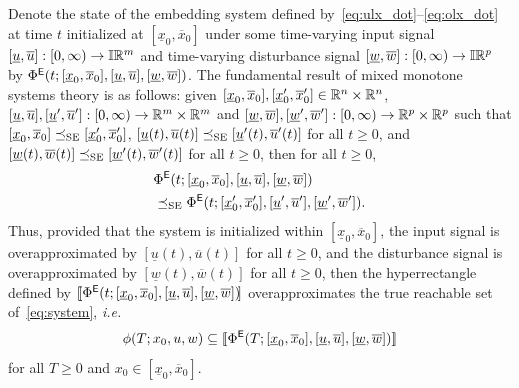 \documentclass{IEEEojcsys}
\newcommand{\ul}{\underline}
\newcommand{\ol}{\overline}
\begin{document}
Denote the state of the embedding system defined by~\eqref{eq:ulx_dot}--\eqref{eq:olx_dot} at time $t$ initialized at $[\ul{x}_0,\ol{x}_0]$ under some time-varying input signal $[\ul{u}, \ol{u}]:[0,\infty)\to\bbI\mathbb{R}^m$ and time-varying disturbance signal $[\ul{w},\ol{w}]:[0,\infty)\to\bbI\mathbb{R}^p$ by $\Phi^\sfE(t;[\ul{x}_0, \ol{x}_0], [\ul{u}, \ol{u}], [\ul{w},\ol{w}])$. 
The fundamental result of mixed monotone systems theory is as follows:
given $[\ulx_0, \olx_0],[\ulx'_0, \olx'_0] \in \mathbb{R}^n\times \mathbb{R}^n$, $[\ulu, \olu], [\ulu', \olu']:[0, \infty) \rightarrow \mathbb{R}^m\times\mathbb{R}^m$ and $[\ulw, \olw],[\ulw', \olw']:[0, \infty) \rightarrow \mathbb{R}^p\times \mathbb{R}^p$ such that $[\ulx_0, \olx_0] \preceq_\text{SE} [\ulx'_0, \olx'_0]$, $[\ulu(t), \olu(t)] \preceq_\text{SE} [\ulu'(t), \olu'(t)]$ for all $t\geq0$, 
and $[\ulw(t), \olw(t)] \preceq_\text{SE} [\ulw'(t), \olw'(t)]$ for all $t\geq0$, then for all $t\geq0$,
\begin{align}
    &\Phi^\sfE(t; [\ul{x}_0, \ol{x}_0], [\ul{u}, \ol{u}], [\ul{w},\ol{w}]) \label{eq:monotone_system}\\ &\preceq_\text{SE} \Phi^\sfE(t; [\ul{x}'_0, \ol{x}'_0], [\ul{u}', \ol{u}'], [\ul{w}',\ol{w}']). \nonumber    
\end{align}
Thus, provided that the system is initialized within $[\ul{x}_0, \ol{x}_0]$, the input signal is overapproximated by $[\ul{u}(t), \ol{u}(t)]$ for all $t\geq0$, 
and the disturbance signal is overapproximated by $[\ul{w}(t),\ol{w}(t)]$ for all $t\geq0$, then the hyperrectangle defined by $[\![\Phi^\sfE(t;[\ul{x}_0, \ol{x}_0], [\ul{u}, \ol{u}], [\ul{w},\ol{w}])\!]$ overapproximates the true reachable set 
of~\eqref{eq:system}, \emph{i.e.}
\begin{equation}
    \phi(T; x_0, u, w) \subseteq [\![\Phi^\sfE(T;[\ul{x}_0, \ol{x}_0], [\ul{u}, \ol{u}], [\ul{w},\ol{w}])]\!]
    \label{eq:mm_fundamental}
\end{equation}
for all $T \geq 0$ and $x_0 \in [\ul{x}_0, \ol{x}_0]$.
\end{document}
